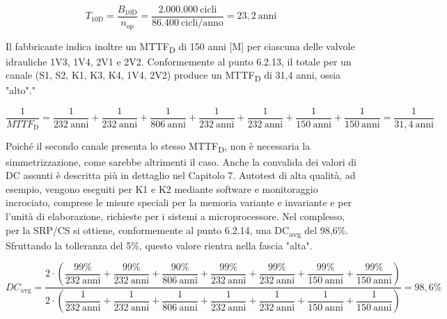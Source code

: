\begin{equation}
    T_{\mathrm{10D}}
    = \frac{B_{\mathrm{10D}}}{n_{\mathrm{op}}}
    = \frac{2{.}000{.}000\ \text{cicli}}{86{.}400\ \text{cicli/anno}}
    = 23{,}2\ \text{anni}
    \label{eq:06-08}
\end{equation}

Il fabbricante indica inoltre un MTTF\textsubscript{D} di 150 anni [M] per ciascuna delle valvole idrauliche 1V3, 1V4, 2V1 e 2V2. Conformemente al punto 6.2.13, il totale per un canale (S1, S2, K1, K3, K4, 1V4, 2V2) produce un MTTF\textsubscript{D} di 31,4 anni, ossia "alto"."

{\small
\begin{equation}
    \frac{1}{\textit{MTTF}_{\mathrm{D}}}
    = \frac{1}{232\ \text{anni}} + \frac{1}{232\ \text{anni}} + \frac{1}{806\ \text{anni}}
    + \frac{1}{232\ \text{anni}} + \frac{1}{232\ \text{anni}} + \frac{1}{150\ \text{anni}}
    + \frac{1}{150\ \text{anni}}
    = \frac{1}{31{,}4\ \text{anni}}
    \label{eq:06-09}
\end{equation}
}

Poiché il secondo canale presenta lo stesso MTTF\textsubscript{D}, non è necessaria la simmetrizzazione, come sarebbe altrimenti il caso. Anche la convalida dei valori di DC assunti è descritta più in dettaglio nel Capitolo 7. Autotest di alta qualità, ad esempio, vengono eseguiti per K1 e K2 mediante software e monitoraggio incrociato, comprese le misure speciali per la memoria variante e invariante e per l'unità di elaborazione, richieste per i sistemi a microprocessore. Nel complesso, per la SRP/CS si ottiene, conformemente al punto 6.2.14, una DC\textsubscript{avg} del 98,6\%. Sfruttando la tolleranza del 5\%, questo valore rientra nella fascia "alta".


{\small
\begin{equation}
    \textit{DC}_{\mathrm{avg}}
    = \frac{2 \cdot \left(
        \dfrac{99\%}{232\ \text{anni}} + \dfrac{99\%}{232\ \text{anni}}
        + \dfrac{90\%}{806\ \text{anni}} + \dfrac{99\%}{232\ \text{anni}}
        + \dfrac{99\%}{232\ \text{anni}} + \dfrac{99\%}{150\ \text{anni}}
        + \dfrac{99\%}{150\ \text{anni}}
      \right)}
      {2 \cdot \left(
        \dfrac{1}{232\ \text{anni}} + \dfrac{1}{232\ \text{anni}}
        + \dfrac{1}{806\ \text{anni}} + \dfrac{1}{232\ \text{anni}}
        + \dfrac{1}{232\ \text{anni}} + \dfrac{1}{150\ \text{anni}}
        + \dfrac{1}{150\ \text{anni}}
      \right)}
    = 98{,}6\%
    \label{eq:06-10}
\end{equation}
}

